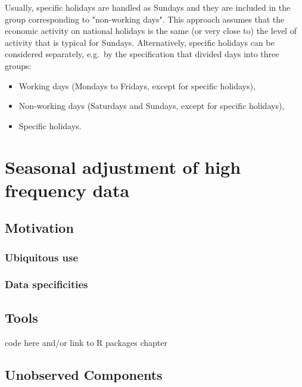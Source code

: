 \documentclass[
  letterpaper,
  DIV=11,
  numbers=noendperiod]{scrreprt}
\begin{document}
Usually, specific holidays are handled as Sundays and they are included
in the group corresponding to "non-working days". This approach assumes
that the economic activity on national holidays is the same (or very
close to) the level of activity that is typical for Sundays.
Alternatively, specific holidays can be considered separately, e.g.~by
the specification that divided days into three groups:

\begin{itemize}
\item
  Working days (Mondays to Fridays, except for specific holidays),
\item
  Non-working days (Saturdays and Sundays, except for specific
  holidays),
\item
  Specific holidays.
\end{itemize}

\hypertarget{seasonal-adjustment-of-high-frequency-data-1}{%
\chapter{Seasonal adjustment of high frequency
data}\label{seasonal-adjustment-of-high-frequency-data-1}}

\hypertarget{motivation-3}{%
\section{Motivation}\label{motivation-3}}

\hypertarget{ubiquitous-use}{%
\subsection{Ubiquitous use}\label{ubiquitous-use}}

\hypertarget{data-specificities}{%
\subsection{Data specificities}\label{data-specificities}}

\hypertarget{tools-1}{%
\section{Tools}\label{tools-1}}

code here and/or link to R packages chapter

\hypertarget{unobserved-components}{%
\section{Unobserved Components}\label{unobserved-components}}
\end{document}
